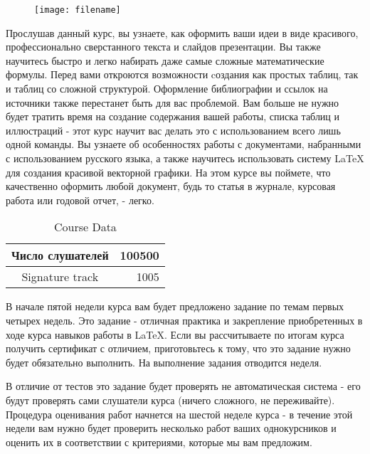 \documentclass[a4paper,12pt]{article}
\begin{document}
\begin{wrapfigure}{l}{0.2\linewidth}
	\texttt{[image: filename]}
\end{wrapfigure}Прослушав данный курс, вы узнаете, как оформить ваши идеи в виде красивого, профессионально сверстанного текста и слайдов презентации. Вы также научитесь быстро и легко набирать даже самые сложные математические формулы. Перед вами откроются возможности cоздания как простых таблиц, так и таблиц со сложной структурой. Оформление библиографии и ссылок на источники также перестанет быть для вас проблемой. Вам больше не нужно будет тратить время на создание содержания вашей работы, списка таблиц и иллюстраций - этот курс научит вас делать это с использованием всего лишь одной команды. Вы узнаете об особенностях работы с документами, набранными с использованием русского языка, а также научитесь использовать систему LaTeX для создания красивой векторной графики. На этом курсе вы поймете, что качественно оформить любой документ, будь то статья в журнале, курсовая работа или годовой отчет, - легко.

\begin{wraptable}{r}{0.4\linewidth}
		\begin{tabular}{|c||r|}
			\hline
			Число слушателей & 100500 \\ \hline
			Signature track  & 1005  \\ \hline
		\end{tabular}
		\caption{Course Data}
\end{wraptable}В начале пятой недели курса вам будет предложено задание по темам первых четырех недель. Это задание - отличная практика и закрепление приобретенных в ходе курса навыков работы в LaTeX. Если вы рассчитываете по итогам курса получить сертификат с отличием, приготовьтесь к тому, что это задание нужно будет обязательно выполнить. На выполнение задания отводится неделя.

В отличие от тестов это задание будет проверять не автоматическая система - его будут проверять сами слушатели курса (ничего сложного, не переживайте). Процедура оценивания работ начнется на шестой неделе курса - в течение этой недели вам нужно будет проверить несколько работ ваших однокурсников и оценить их в соответствии с критериями, которые мы вам предложим.
\end{document}
